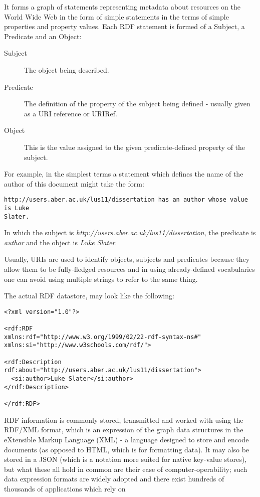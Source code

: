 \documentclass{article}
\begin{document}
It forms a graph of statements representing metadata about resources on the
World Wide Web in the form of simple statements in the terms of simple
properties and property values. Each RDF statement is formed of a Subject, a
Predicate and an Object:

\begin{description}
    \item[Subject] The object being described.
    \item[Predicate] The definition of the property of the subject being
    defined - usually given as a URI reference or URIRef.
    \item[Object] This is the value assigned to the given
    predicate-defined property of the subject.
\end{description}

For example, in the simplest terms a statement which defines the name of the author of
this document might take the form:

\begin{lstlisting}
http://users.aber.ac.uk/lus11/dissertation has an author whose value is Luke
Slater.
\end{lstlisting}

In which the subject is \emph{http://users.aber.ac.uk/lus11/dissertation}, the
predicate is \emph{author} and the object is \emph{Luke Slater}.

Usually, URIs are used to identify objects, subjects and predicates because they
allow them to be fully-fledged resources and in using already-defined
vocabularies one can avoid using multiple strings to refer to the same thing.

The actual RDF datastore, may look like the following:

\begin{lstlisting}
<?xml version="1.0"?>

<rdf:RDF
xmlns:rdf="http://www.w3.org/1999/02/22-rdf-syntax-ns#"
xmlns:si="http://www.w3schools.com/rdf/">

<rdf:Description rdf:about="http://users.aber.ac.uk/lus11/dissertation">
  <si:author>Luke Slater</si:author>
</rdf:Description>

</rdf:RDF> 
\end{lstlisting}

RDF information is commonly stored, transmitted and worked with using the
RDF/XML format, which is an expression of the graph data structures in the
eXtensible Markup Language (XML) - a language designed to store and encode
documents (as opposed to HTML, which is for formatting data). It may also be
stored in a JSON (which is a notation more suited for native key-value stores),
but what these all hold in common are their ease of computer-operability; such
data expression formats are widely adopted and there exist hundreds of thousands
of applications which rely on 
\end{document}
